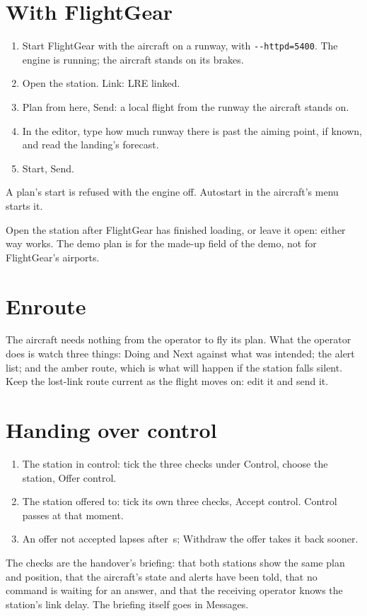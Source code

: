 \documentclass[11pt,a4paper,oneside]{book}
\newcommand{\ann}[1]{\textsf{#1}}
\begin{document}
\section{With FlightGear}
\begin{enumerate}
\item Start FlightGear with the aircraft on a runway, with \texttt{-{}-httpd=5400}. The engine is running; the
aircraft stands on its brakes.
\item Open the station. \ann{Link}: \ann{LRE linked}.
\item \ann{Plan from here}, \ann{Send}: a local flight from the runway the aircraft stands on.
\item In the editor, type how much runway there is past the aiming point, if known, and read the landing's forecast.
\item \ann{Start}, \ann{Send}.
\end{enumerate}
\begin{note}
A plan's start is refused with the engine off. \ann{Autostart} in the aircraft's menu starts it.
\end{note}
\begin{caution}
Open the station after FlightGear has finished loading, or leave it open: either way works. The demo plan is for the
made-up field of the demo, not for FlightGear's airports.
\end{caution}

\section{Enroute}
The aircraft needs nothing from the operator to fly its plan. What the operator does is watch three things: \ann{Doing}
and \ann{Next} against what was intended; the alert list; and the amber route, which is what will happen if the
station falls silent. Keep the lost-link route current as the flight moves on: edit it and send it.

\section{Handing over control}
\begin{enumerate}
\item The station in control: tick the three checks under \ann{Control}, choose the station, \ann{Offer control}.
\item The station offered to: tick its own three checks, \ann{Accept control}. Control passes at that moment.
\item An offer not accepted lapses after \MOfferSec\,s; \ann{Withdraw the offer} takes it back sooner.
\end{enumerate}
The checks are the handover's briefing: that both stations show the same plan and position, that the aircraft's state
and alerts have been told, that no command is waiting for an answer, and that the receiving operator knows the
station's link delay. The briefing itself goes in \ann{Messages}.
\end{document}

